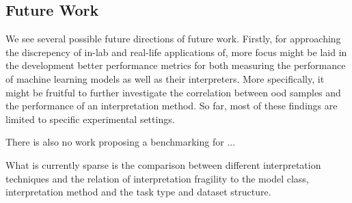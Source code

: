 \subsection{Future Work}
We see several possible future directions of future work. 
Firstly, for approaching the discrepency of in-lab and real-life applications of, more focus might be laid in the development better performance metrics for both measuring the performance of machine learning models as well as their interpreters. 
More specifically, it might be fruitful to further investigate the correlation between ood samples and the performance of an interpretation method. So far, most of these findings are limited to specific experimental settings. 


There is also no work proposing a benchmarking for ... 

What is currently sparse is the comparison between different interpretation techniques and the relation of interpretation fragility to the model class, interpretation method and the task type and dataset structure. 
